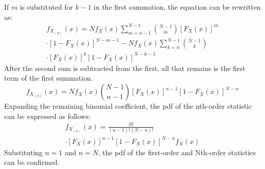 \documentclass[conference]{IEEEtran}
\begin{document}
If $m$ is substituted for $k-1$ in the first summation, the equation can be rewritten as:
\begin{equation}
\begin{gathered}
f_{X_{(n)}}(x) = Nf_X(x)\sum_{m=n-1}^{N-1}\binom{N-1}{m}[F_X(x)]^{m}\\
\cdot[1-F_X(x)]^{N-m-1} - Nf_X(x)\sum_{k=n}^{N-1}\binom{N-1}{k}\\
\cdot[F_X(x)]^{k}[1-F_X(x)]^{N-k-1}
\end{gathered}
\end{equation}
After the second sum is subtracted from the first, all that remains is the first term of the first summation.
\begin{equation}
f_{X_{(n)}}(x) = Nf_X(x)\binom{N-1}{n-1}[F_X(x)]^{n-1}[1-F_X(x)]^{N-n}
\end{equation}
Expanding the remaining binomial coefficient, the pdf of the nth-order statistic can be expressed as follows:
\begin{equation}
\begin{gathered}
f_{X_{(n)}}(x) = \frac{N!}{(n-1)!(N-n)!}\\
\cdot[F_X(x)]^{n-1}[1-F_X(x)]^{N-n}f_X(x)
\end{gathered}
\end{equation}
Substituting $n=1$ and $n=N$, the pdf of the first-order and Nth-order statistics can be confirmed. 
\end{document}
